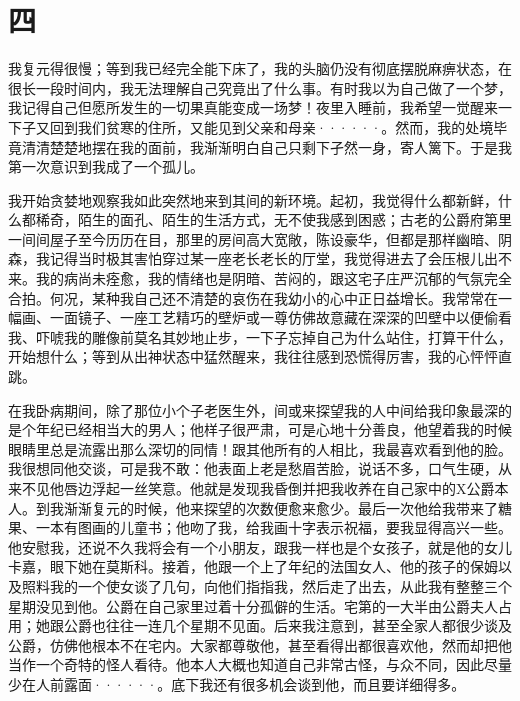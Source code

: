 \documentclass[12pt, UTF8]{ctexbook}
\begin{document}
\section*{四}
\par 我复元得很慢；等到我已经完全能下床了，我的头脑仍没有彻底摆脱麻痹状态，在很长一段时间内，我无法理解自己究竟出了什么事。有时我以为自己做了一个梦，我记得自己但愿所发生的一切果真能变成一场梦！夜里入睡前，我希望一觉醒来一下子又回到我们贫寒的住所，又能见到父亲和母亲······。然而，我的处境毕竟清清楚楚地摆在我的面前，我渐渐明白自己只剩下孑然一身，寄人篱下。于是我第一次意识到我成了一个孤儿。
\par 我开始贪婪地观察我如此突然地来到其间的新环境。起初，我觉得什么都新鲜，什么都稀奇，陌生的面孔、陌生的生活方式，无不使我感到困惑；古老的公爵府第里一间间屋子至今历历在目，那里的房间高大宽敞，陈设豪华，但都是那样幽暗、阴森，我记得当时极其害怕穿过某一座老长老长的厅堂，我觉得进去了会压根儿出不来。我的病尚未痊愈，我的情绪也是阴暗、苦闷的，跟这宅子庄严沉郁的气氛完全合拍。何况，某种我自己还不清楚的哀伤在我幼小的心中正日益增长。我常常在一幅画、一面镜子、一座工艺精巧的壁炉或一尊仿佛故意藏在深深的凹壁中以便偷看我、吓唬我的雕像前莫名其妙地止步，一下子忘掉自己为什么站住，打算干什么，开始想什么；等到从出神状态中猛然醒来，我往往感到恐慌得厉害，我的心怦怦直跳。
\par 在我卧病期间，除了那位小个子老医生外，间或来探望我的人中间给我印象最深的是个年纪已经相当大的男人；他样子很严肃，可是心地十分善良，他望着我的时候眼睛里总是流露出那么深切的同情！跟其他所有的人相比，我最喜欢看到他的脸。我很想同他交谈，可是我不敢：他表面上老是愁眉苦脸，说话不多，口气生硬，从来不见他唇边浮起一丝笑意。他就是发现我昏倒并把我收养在自己家中的X公爵本人。到我渐渐复元的时候，他来探望的次数便愈来愈少。最后一次他给我带来了糖果、一本有图画的儿童书；他吻了我，给我画十字表示祝福，要我显得高兴一些。他安慰我，还说不久我将会有一个小朋友，跟我一样也是个女孩子，就是他的女儿卡嘉，眼下她在莫斯科。接着，他跟一个上了年纪的法国女人、他的孩子的保姆以及照料我的一个使女谈了几句，向他们指指我，然后走了出去，从此我有整整三个星期没见到他。公爵在自己家里过着十分孤僻的生活。宅第的一大半由公爵夫人占用；她跟公爵也往往一连几个星期不见面。后来我注意到，甚至全家人都很少谈及公爵，仿佛他根本不在宅内。大家都尊敬他，甚至看得出都很喜欢他，然而却把他当作一个奇特的怪人看待。他本人大概也知道自己非常古怪，与众不同，因此尽量少在人前露面······。底下我还有很多机会谈到他，而且要详细得多。
\end{document}
